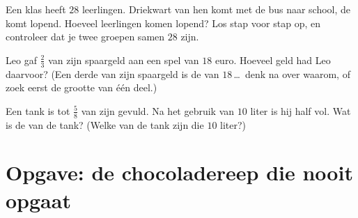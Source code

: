 \begin{exercise}[$\star\star$]\label{exo:g6:fractions:10}
Een klas heeft $28$ leerlingen. Driekwart van hen komt met de bus naar school,
de  komt lopend. Hoeveel leerlingen komen lopend? Los stap voor stap op, en
controleer dat je twee groepen samen $28$ zijn.
\end{exercise}

\begin{exercise}[$\star\star$]\label{exo:g6:fractions:11}
Leo gaf $\frac23$ van zijn spaargeld aan een spel van $18$ euro. Hoeveel geld
had Leo daarvoor? (Een derde van zijn spaargeld is de  van $18$\,\dots\
denk na over waarom, of zoek eerst de grootte van één deel.)
\end{exercise}

\begin{exercise}[$\star\star\star$]\label{exo:g6:fractions:12}
Een tank is tot $\frac58$ van zijn  gevuld. Na het gebruik van $10$
liter is hij half vol. Wat is de \omterm{def:g2:measure:units}{inhoud} van de tank? (Welke  van de tank
zijn die $10$ liter?)
\end{exercise}

\section{Opgave: de chocoladereep die nooit opgaat}

